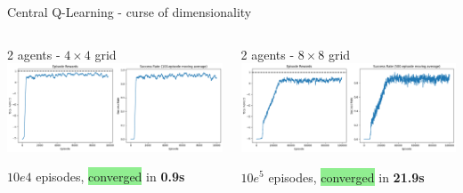 \documentclass[aspectratio=169,xcolor=dvipsnames]{beamer}
\begin{document}
\begin{frame}{Central Q-Learning - curse of dimensionality}
    
\centering
\begin{columns}
    \begin{column}{0.5\textwidth}
        \begin{block}{2 agents - $4 \times 4$ grid}
        \scriptsize
            \centering
            \includegraphics[scale=0.18]{images/2-agents-4x4-10000ep.png}
            
            $10e4$ episodes, \colorbox{lightgreen}{converged} in \textbf{0.9s}
        \end{block}
    \end{column}
    \begin{column}{0.5\textwidth}
        \begin{block}{2 agents - $8 \times 8$ grid}
        \scriptsize
            \centering
            \includegraphics[scale=0.18]{images/2-agents-8x8-100000ep.png}
            
            $10e^5$ episodes, \colorbox{lightgreen}{converged} in \textbf{21.9s}
        \end{block}
    \end{column}
\end{columns}


\end{frame}
\end{document}
